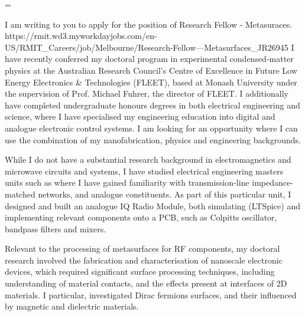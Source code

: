 \documentclass[10pt,a4paper,ragged2e,withhyper,paragraphstrue]{altacv}
\newcommand{\textalignment}{
    \tolerance=1 %
    \emergencystretch=\maxdimen
    \hyphenpenalty=10000 
    \hbadness=10000
}
\newcommand{\pind}{\hspace{24pt}}
\begin{document}
    

    \vspace{1em}

    {
    \textalignment
    \pind I am writing to you to apply for the position of Research Fellow - Metasuraces.
    {https://rmit.wd3.myworkdayjobs.com/en-US/RMIT_Careers/job/Melbourne/Research-Fellow---Metasurfaces_JR26945}
    I have recently conferred my doctoral program in experimental condensed-matter physics at the Australian Research Council's 
    Centre of Excellence in Future Low Energy Electronics \& Technologies (FLEET), based at Monash University
    under the supervision of Prof. Michael Fuhrer, the director of FLEET. 
    I additionally have completed undergraduate honours degrees in both electrical engineering and science, where I have specialised my 
    engineering education into digital and analogue electronic control systems. I am looking for an opportunity where I can
    use the combination of my nanofabrication, physics and engineering backgrounds.

    \pind While I do not have a substantial research background in electromagnetics and microwave circuits and systems, I have studied 
    electrical engineering masters units such as 
    where I have gained familiarity with transmission-line impedance-matched networks, and analogue constituents.
    As part of this particular unit, I designed and built an analogue IQ Radio Module, both simulating (LTSpice) and 
    implementing relevant components onto a PCB, such as Colpitts oscillator, bandpass filters and mixers.

    \pind Relevant to the processing of metasurfaces for RF components, my doctoral research involved the fabrication and characterisation
    of nanoscale electronic devices, which required significant surface processing techniques, 
    including understanding of material contacts, and the effects present at interfaces of 2D materials. 
    I particular, investigated Dirac fermions surfaces, and their influenced by magnetic and dielectric materials.
    

}
\end{document}
